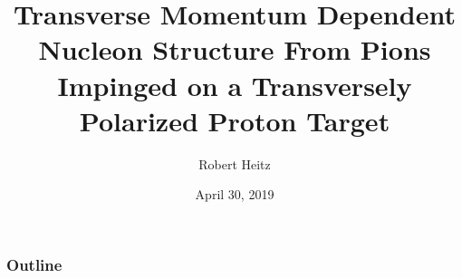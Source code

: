 \documentclass{beamer}
\title[TMD Nucleon Structure] {Transverse Momentum Dependent Nucleon Structure
  From Pions Impinged on a Transversely Polarized Proton Target}
\author[Robert Heitz]{Robert Heitz}
\institute[UIUC]{University of Illinois}
\date[April 2019]{April 30, 2019}
\begin{document}
\frame{\titlepage}

\begin{frame}
  \frametitle{Outline}
  \tableofcontents
\end{frame}


%
%
%
%
%
%
%
 
\end{document}
